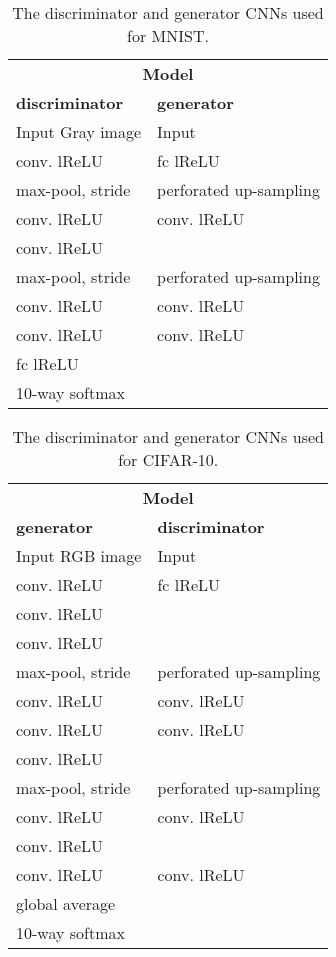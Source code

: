 \documentclass{article} \usepackage{iclr2016_conference,times}
\begin{document}
\begin{appendix}
\begin{table}[h]
\caption{The discriminator and generator CNNs used for MNIST.}
\label{base-models}
\begin{center}
\begin{small}
\begin{tabular}{l|l}
\multicolumn{2}{c}{\textbf{Model}} \\
\bf discriminator         & \bf generator   \\
\hline
Input  Gray image & Input  \\
\hline
 conv.  lReLU &  fc lReLU  \\
\hline
 max-pool, stride  &  perforated up-sampling \\
\hline
 conv.  lReLU &  conv.  lReLU \\
 conv.  lReLU & \\
\hline
 max-pool, stride  &  perforated
                                    up-sampling \\
\hline
 conv.  lReLU &  conv.  lReLU \\
 conv.  lReLU &  conv.  lReLU \\
 fc lReLU & \\ 10-way softmax & \\
\end{tabular}
\end{small}
\end{center}
\end{table}

\begin{table}[h]
\caption{The discriminator and generator CNNs used for CIFAR-10.}
\label{base-models-cifar}
\begin{center}
\begin{small}
\begin{tabular}{l|l}
\multicolumn{2}{c}{\textbf{Model}} \\
\bf generator         & \bf discriminator   \\
\hline
Input  RGB image & Input  \\
\hline
 conv.  lReLU &  fc lReLU  \\
 conv.  lReLU &  \\
 conv.  lReLU &  \\
\hline
 max-pool, stride  &  perforated up-sampling \\
\hline
 conv.  lReLU &  conv.  lReLU \\
 conv.  lReLU &  conv.  lReLU \\
 conv.  lReLU & \\
\hline
 max-pool, stride  &  perforated
                                    up-sampling \\
\hline
 conv.  lReLU &  conv.  lReLU \\
 conv.  lReLU & \\ 
 conv.  lReLU &  conv.  lReLU \\
global average & \\
10-way softmax & \\
\end{tabular}
\end{small}
\end{center}
\end{table}


\end{appendix}
\end{document}
